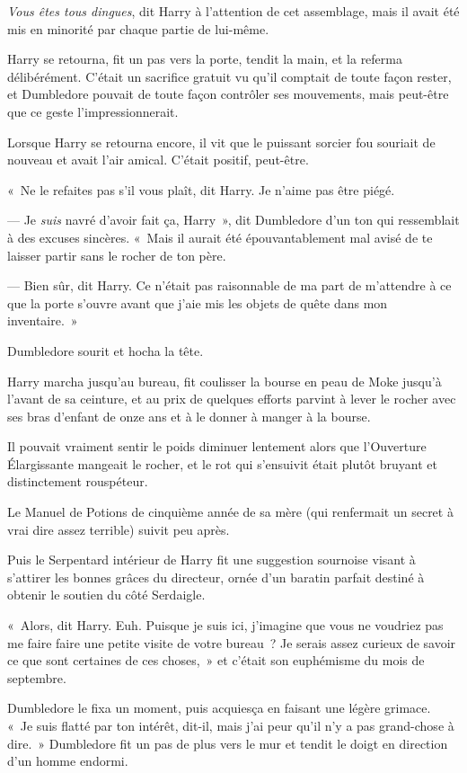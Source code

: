 \emph{Vous êtes tous dingues}, dit Harry à l'attention de cet assemblage, mais il avait été mis en minorité par chaque partie de lui-même.

Harry se retourna, fit un pas vers la porte, tendit la main, et la referma délibérément.
C'était un sacrifice gratuit vu qu'il comptait de toute façon rester, et Dumbledore pouvait de toute façon contrôler ses mouvements, mais peut-être que ce geste l'impressionnerait.

Lorsque Harry se retourna encore, il vit que le puissant sorcier fou souriait de nouveau et avait l'air amical.
C'était positif, peut-être.

«~Ne le refaites pas s'il vous plaît, dit Harry.
Je n'aime pas être piégé.

--- Je \emph{suis} navré d'avoir fait ça, Harry~», dit Dumbledore d'un ton qui ressemblait à des excuses sincères.
«~Mais il aurait été épouvantablement mal avisé de te laisser partir sans le rocher de ton père.

--- Bien sûr, dit Harry.
Ce n'était pas raisonnable de ma part de m'attendre à ce que la porte s'ouvre avant que j'aie mis les objets de quête dans mon inventaire.~»

Dumbledore sourit et hocha la tête.

Harry marcha jusqu'au bureau, fit coulisser la bourse en peau de Moke jusqu'à l'avant de sa ceinture, et au prix de quelques efforts parvint à lever le rocher avec ses bras d'enfant de onze ans et à le donner à manger à la bourse.

Il pouvait vraiment sentir le poids diminuer lentement alors que l'Ouverture Élargissante mangeait le rocher, et le rot qui s'ensuivit était plutôt bruyant et distinctement rouspéteur.

Le Manuel de Potions de cinquième année de sa mère (qui renfermait un secret à vrai dire assez terrible) suivit peu après.

Puis le Serpentard intérieur de Harry fit une suggestion sournoise visant à s'attirer les bonnes grâces du directeur, ornée d'un baratin parfait destiné à obtenir le soutien du côté Serdaigle.

«~Alors, dit Harry.
Euh. Puisque je suis ici, j'imagine que vous ne voudriez pas me faire faire une petite visite de votre bureau~?
Je serais assez curieux de savoir ce que sont certaines de ces choses,~» et c'était son euphémisme du mois de septembre.

Dumbledore le fixa un moment, puis acquiesça en faisant une légère grimace.
«~Je suis flatté par ton intérêt, dit-il, mais j'ai peur qu'il n'y a pas grand-chose à dire.~»
Dumbledore fit un pas de plus vers le mur et tendit le doigt en direction d'un homme endormi.

